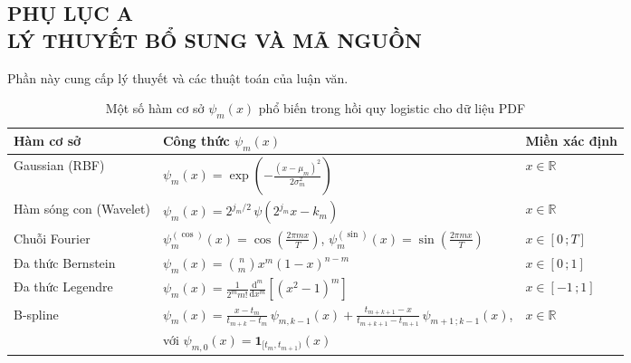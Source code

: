 \documentclass[a4paper,oneside]{book} %
\theoremstyle{plain}
\theoremstyle{plain}
\theoremstyle{nonumberplain}
\begin{document}
\begin{spacing}{1.0}

\chapter*{PHỤ LỤC A\\LÝ THUYẾT BỔ SUNG VÀ MÃ NGUỒN}\label{phulucC}

\fontsize{12pt}{14pt}\selectfont


Phần này cung cấp lý thuyết và các thuật toán của luận văn.

\begin{table}[H]
	\centering
	\caption{Một số hàm cơ sở $\psi_m(x)$ phổ biến trong hồi quy logistic cho dữ liệu PDF}
	\label{tab:basis_functions}
	\fontsize{11pt}{14pt}\selectfont
	\begin{tabular*}{\linewidth}{@{\extracolsep\fill}lll@{\extracolsep\fill}}
		\toprule
		\textbf{Hàm cơ sở} & \textbf{Công thức $\psi_m(x)$} & \textbf{Miền xác định} \\
		\midrule
		Gaussian (RBF) &
		$ \psi_m(x) = \exp\left(-\frac{(x - \mu_m)^2}{2\sigma_m^2}\right)$ &
		$x \in \mathbb{R}$ \\
		
		Hàm sóng con (Wavelet) &
		$\displaystyle \psi_m(x) = 2^{j_m/2} \, \psi\left(2^{j_m} x - k_m\right)$ &
		$x \in \mathbb{R}$ \\
		
		{Chuỗi Fourier} &
		$ \psi_{m}^{(\cos)}(x) = \cos\left(\frac{2\pi m x}{T}\right)$, \quad
		$ \psi_{m}^{(\sin)}(x) = \sin\left(\frac{2\pi m x}{T}\right)$ &
		$x \in [0\,;T]$ \\
		
		{Đa thức Bernstein} &
		$ \psi_m(x) = \binom{n}{m} x^{m} (1-x)^{n-m}$ &
		$x \in [0\,;1]$ \\
		
		{Đa thức Legendre} &
		$ \psi_m(x) = \frac{1}{2^{m} m!} \frac{\mathrm{d}^m}{\mathrm{d}x^m} \left[(x^2 - 1)^{m}\right]$ &
		$x \in [-1\,;1]$ \\
		
		{B-spline} &
		$ \psi_m(x) = \frac{x - t_m}{t_{m+k} - t_m} \, \psi_{m,k-1}(x) +
		\frac{t_{m+k+1} - x}{t_{m+k+1} - t_{m+1}} \, \psi_{m+1\,;k-1}(x)$, &
		$x \in \mathbb{R}$ \\
		& với $\psi_{m,0}(x) = \bm{1}_{[t_m, t_{m+1})}(x)$ &
		\\
		\bottomrule
	\end{tabular*}
\end{table}




\end{spacing}
\end{document}
